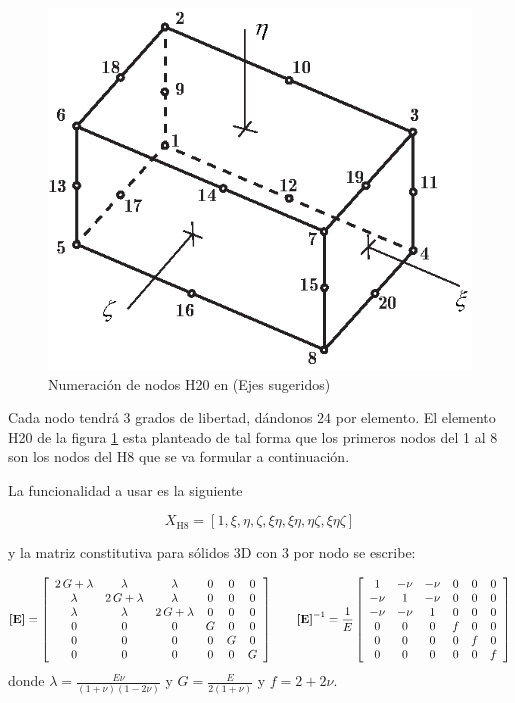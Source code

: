\begin{figure}[htb!]
	\centering
	\includegraphics[width=.6\textwidth]{fig/H20numbering.eps}
	\caption{Numeración de nodos H20 en \Adina (Ejes sugeridos)}
	\label{fig:H20numbering}
\end{figure}

Cada nodo tendrá $3$ grados de libertad, dándonos $24$ \dof{} por elemento. El elemento H20 de la figura \ref{fig:H20numbering} esta planteado de tal forma que los primeros nodos del 1 al 8 son los nodos del H8 que se va formular a continuación.

La funcionalidad a usar es la siguiente

\[
X_{\mathrm{H8}} = \left[1, \xi, \eta, \zeta, \xi \eta, \xi \eta, \eta \zeta, \xi \eta \zeta \right]
\]


y la matriz constitutiva para sólidos 3D con 3 \dof{} por nodo se escribe:

\begin{equation}
	\boldsymbol{[}\mathbf{E} \boldsymbol{]} =\left[\begin{array}{cccccc} 2\,G+\lambda  & \lambda  & \lambda  & 0 & 0 & 0\\ \lambda  & 2\,G+\lambda  & \lambda  & 0 & 0 & 0\\ \lambda  & \lambda  & 2\,G+\lambda  & 0 & 0 & 0\\ 0 & 0 & 0 & G & 0 & 0\\ 0 & 0 & 0 & 0 & G & 0\\ 0 & 0 & 0 & 0 & 0 & G \end{array}\right] \qquad \boldsymbol{[}\mathbf{E} \boldsymbol{]}^{-1}=\frac{1}{E}\left[\begin{array}{cccccc} 1 & -\nu  & -\nu  & 0 & 0 & 0\\ -\nu  & 1 & -\nu  & 0 & 0 & 0\\ -\nu  & -\nu  & 1 & 0 & 0 & 0\\ 0 & 0 & 0 & f & 0 & 0\\ 0 & 0 & 0 & 0 & f & 0\\ 0 & 0 & 0 & 0 & 0 & f \end{array}\right]
\end{equation}
donde $\lambda = \frac{E \nu}{(1+\nu)(1-2\nu)}$ y $G=\frac{E}{2(1+\nu)}$ y $f = 2+2\nu$.

